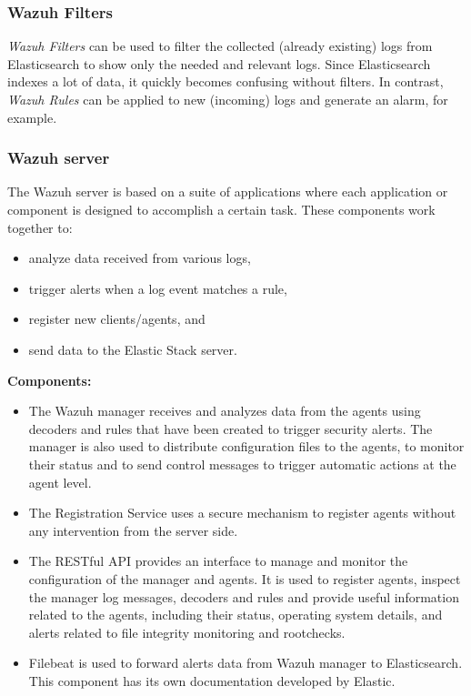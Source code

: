 \subsubsection{Wazuh Filters}
\textit{Wazuh Filters} can be used to filter the collected (already existing) logs from Elasticsearch to show only the needed and relevant logs. Since Elasticsearch indexes a lot of data, it quickly becomes confusing without filters.
In contrast, \textit{Wazuh Rules} can be applied to new (incoming) logs and generate an alarm, for example.


\subsubsection{Wazuh server}
The Wazuh server is based on a suite of applications where each application or component is designed to accomplish a certain task. These components work together to:
\begin{itemize}
    \item analyze data received from various logs,
    \item trigger alerts when a log event matches a rule,
    \item register new clients/agents, and
    \item send data to the Elastic Stack server.
\end{itemize}


\textbf{Components:}
\begin{itemize}
    \item The Wazuh manager receives and analyzes data from the agents using decoders and rules that have been created to trigger security alerts. The manager is also used to distribute configuration files to the agents, to monitor their status and to send control messages to trigger automatic actions at the agent level.
    \item The Registration Service uses a secure mechanism to register agents without any intervention from the server side.
    \item The RESTful API provides an interface to manage and monitor the configuration of the manager and agents. It is used to register agents, inspect the manager log messages, decoders and rules and provide useful information related to the agents, including their status, operating system details, and alerts related to file integrity monitoring and rootchecks.
    \item Filebeat is used to forward alerts data from Wazuh manager to Elasticsearch. This component has its own documentation developed by Elastic.
\end{itemize}